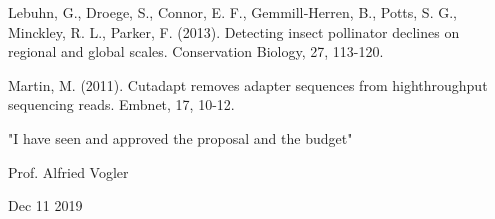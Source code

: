 \documentclass[11pt, a4paper]{article}
\begin{document}
\vspace{0.5\baselineskip}
Lebuhn, G., Droege, S., Connor, E. F., Gemmill‐Herren, B., Potts, S. G., Minckley, R. L., Parker, F. (2013). Detecting insect pollinator declines on regional and global scales. Conservation Biology, 27, 113-120.

\vspace{0.5\baselineskip}
Martin, M. (2011). Cutadapt removes adapter sequences from highthroughput sequencing reads. Embnet, 17, 10-12. 

\clearpage 

"I have seen and approved the proposal and the budget"

\vspace{5\baselineskip}

Prof. Alfried Vogler

Dec 11 2019
\end{document}
